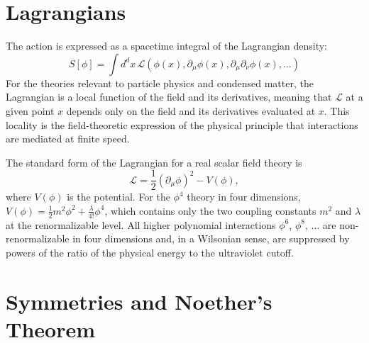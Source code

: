 \documentclass[11pt, twoside, openright]{book}
\theoremstyle{dotted}
\theoremstyle{definition}
\begin{document}
\section{Lagrangians}

The action is expressed as a spacetime integral of the Lagrangian density:
\begin{equation}
  S[\phi] = \int d^dx \, \mathcal{L}(\phi(x), \partial_\mu\phi(x), \partial_\mu\partial_\nu\phi(x), \ldots)
  \label{eq:action_lagrangian}
\end{equation}
For the theories relevant to particle physics and condensed matter, the Lagrangian
is a local function of the field and its derivatives, meaning that $\mathcal{L}$
at a given point $x$ depends only on the field and its derivatives evaluated at
$x$. This locality is the field-theoretic expression of the physical principle that
interactions are mediated at finite speed.

The standard form of the Lagrangian for a real scalar field theory is
\begin{equation}
  \mathcal{L} = \frac{1}{2}(\partial_\mu\phi)^2 - V(\phi),
  \label{eq:scalar_lagrangian}
\end{equation}
where $V(\phi)$ is the potential. For the $\phi^4$ theory in four dimensions,
$V(\phi) = \frac{1}{2}m^2\phi^2 + \frac{\lambda}{4!}\phi^4$, which contains only
the two coupling constants $m^2$ and $\lambda$ at the renormalizable level. All
higher polynomial interactions $\phi^6$, $\phi^8$, $\ldots$ are non-renormalizable
in four dimensions and, in a Wilsonian sense, are suppressed by powers of the
ratio of the physical energy to the ultraviolet cutoff.

\section{Symmetries and Noether's Theorem}
\end{document}
